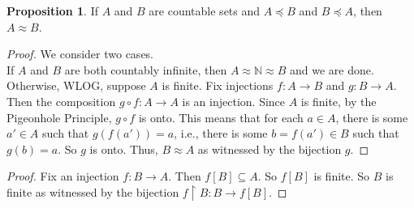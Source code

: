 \documentclass[14pt]{article}
\theoremstyle{definition}
\newtheorem{proposition}[definition]{Proposition}
\newcommand{\fun}[3]{#1\colon #2\rightarrow#3}
\newcommand{\bb}[1]{\mathbb{#1}}
\newcommand{\restrict}{\upharpoonright}
\begin{document}
\vspace{2mm}

\begin{proposition}
    If $A$ and $B$ are countable sets and $A\preceq B$ and $B\preceq A$, then $A\approx B$.
\end{proposition}
\begin{proof}
    We consider two cases.\\
    If $A$ and $B$ are both countably infinite, then $A\approx\bb{N}\approx B$ and we are done. \\
    Otherwise, WLOG, suppose $A$ is finite. Fix injections $\fun{f}{A}{B}$
    and $\fun{g}{B}{A}$. Then the composition $g\circ f\colon A\rightarrow A$ 
    is an injection. Since $A$ is finite, by the Pigeonhole Principle, $g\circ f$
    is onto. This means that for each $a\in A$, there is some $a'\in A$ such that
    $g(f(a'))=a$, i.e., there is some $b=f(a')\in B$ such that $g(b)=a$. So $g$ is onto.
    Thus, $B\approx A$ as witnessed by the bijection $g$.
\end{proof}
\begin{proof}
     Fix an injection $\fun{f}{B}{A}$. Then $f[B]\subseteq A$. So $f[B]$ is finite.
     So $B$ is finite as witnessed by the bijection $f\restrict B\colon B\rightarrow f[B]$.

\end{proof}

\vspace{2mm}
\end{document}
